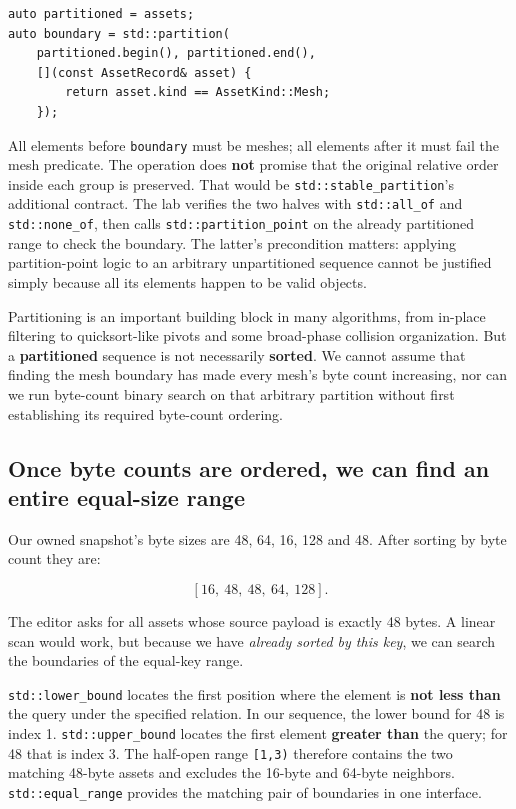 \begin{verbatim}
auto partitioned = assets;
auto boundary = std::partition(
    partitioned.begin(), partitioned.end(),
    [](const AssetRecord& asset) {
        return asset.kind == AssetKind::Mesh;
    });
\end{verbatim}

All elements before \texttt{boundary} must be meshes; all elements after it must fail the mesh predicate. The operation does \textbf{not} promise that the original relative order inside each group is preserved. That would be \texttt{std::stable\_partition}'s additional contract. The lab verifies the two halves with \texttt{std::all\_of} and \texttt{std::none\_of}, then calls \texttt{std::partition\_point} on the already partitioned range to check the boundary. The latter's precondition matters: applying partition-point logic to an arbitrary unpartitioned sequence cannot be justified simply because all its elements happen to be valid objects.

Partitioning is an important building block in many algorithms, from in-place filtering to quicksort-like pivots and some broad-phase collision organization. But a \textbf{partitioned} sequence is not necessarily \textbf{sorted}. We cannot assume that finding the mesh boundary has made every mesh's byte count increasing, nor can we run byte-count binary search on that arbitrary partition without first establishing its required byte-count ordering.

\subsection{Once byte counts are ordered, we can find an entire equal-size range}\label{01-foundations-i-ch006-once-byte-counts-are-ordered-we-can-find-an-entire-equal-size-range}

Our owned snapshot's byte sizes are 48, 64, 16, 128 and 48. After sorting by byte count they are:

\[
[16,\ 48,\ 48,\ 64,\ 128].
\]

The editor asks for all assets whose source payload is exactly 48 bytes. A linear scan would work, but because we have \emph{already sorted by this key}, we can search the boundaries of the equal-key range.

\texttt{std::lower\_bound} locates the first position where the element is \textbf{not less than} the query under the specified relation. In our sequence, the lower bound for 48 is index 1. \texttt{std::upper\_bound} locates the first element \textbf{greater than} the query; for 48 that is index 3. The half-open range \texttt{{[}1,3)} therefore contains the two matching 48-byte assets and excludes the 16-byte and 64-byte neighbors. \texttt{std::equal\_range} provides the matching pair of boundaries in one interface.

